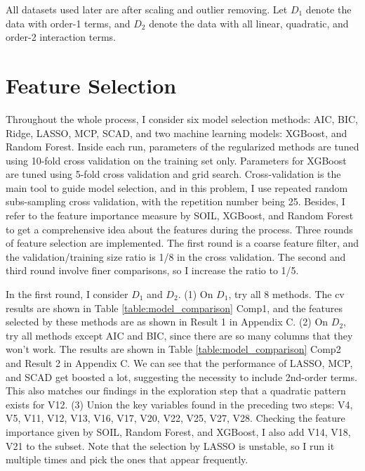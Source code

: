 \documentclass[11pt a4paper]{article}
\begin{document}
	All datasets used later are after scaling and outlier removing. Let $D_1$ denote the data with order-1 terms, and $D_2$ denote the data with all linear, quadratic, and order-2 interaction terms.
	
	\section{Feature Selection}\label{sec: feature-selection}
	Throughout the whole process, I consider six model selection methods: AIC, BIC, Ridge, LASSO, MCP, SCAD, and two machine learning models: XGBoost\cite{chen2016xgboost}, and Random Forest. Inside each run, parameters of the regularized methods are tuned using 10-fold cross validation on the training set only. Parameters for XGBoost are tuned using 5-fold cross validation and grid search. Cross-validation is the main tool to guide model selection, and in this problem, I use repeated random subs-sampling cross validation, with the repetition number being 25. Besides, I refer to the feature importance measure by SOIL\cite{soilR}, XGBoost, and Random Forest to get a comprehensive idea about the features during the process.
	Three rounds of feature selection are implemented. The first round is a coarse feature filter, and the validation/training size ratio is 1/8 in the cross validation. The second and third round involve finer comparisons, so I increase the ratio to 1/5. 
	
	In the first round, I consider $D_1$ and $D_2$. (1) On $D_1$, try all 8 methods. The cv results are shown in Table \ref{table:model_comparison} Comp1, and the features selected by these methods are as shown in Result 1 in Appendix C. (2) On $D_2$, try all methods except AIC and BIC, since there are so many columns that they won't work. The results are shown in Table \ref{table:model_comparison} Comp2 and Result 2 in Appendix C. We can see that the performance of LASSO, MCP, and SCAD get boosted a lot, suggesting the necessity to include 2nd-order terms. This also matches our findings in the exploration step that a quadratic pattern exists for V12. (3) Union the key variables found in the preceding two steps: {V4, V5, V11, V12, V13, V16, V17, V20, V22, V25, V27, V28}. Checking the feature importance given by SOIL, Random Forest, and XGBoost, I also add {V14, V18, V21} to the subset. Note that the selection by LASSO is unstable, so I run it multiple times and pick the ones that appear frequently.
	
\end{document}
